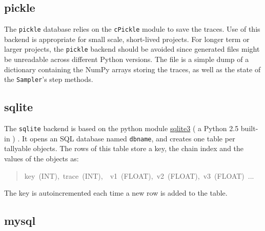 
\hypertarget{pickle}{}
\subsection{pickle}
\label{pickle}

The \texttt{pickle} database relies on the \texttt{cPickle} module to save the
traces. Use of this backend is appropriate for small scale,
short-lived projects. For longer term or larger projects, the \texttt{pickle}
backend should be avoided since generated files might be unreadable
across different Python versions. The  file is a simple dump of a
dictionary containing the NumPy arrays storing the traces, as well as
the state of the \texttt{Sampler}'s step methods.



\hypertarget{sqlite}{}
\subsection{sqlite}
\label{sqlite}

The \texttt{sqlite} backend is based on the python module \href{http://www.sqlite.org}{sqlite3} (
a Python 2.5 built-in ) . It opens an SQL database named \texttt{dbname},
and creates one table per tallyable objects. The rows of this table
store a key, the chain index and the values of the objects as:
\begin{quote}{\ttfamily \raggedright \noindent
key~(INT),~trace~(INT),~~v1~(FLOAT),~v2~(FLOAT),~v3~(FLOAT)~...
}\end{quote}

The key is autoincremented each time a new row is added to the table.
\begin{center}\begin{sffamily}
\end{sffamily}
\end{center}



\hypertarget{mysql}{}
\subsection{mysql}
\label{mysql}

